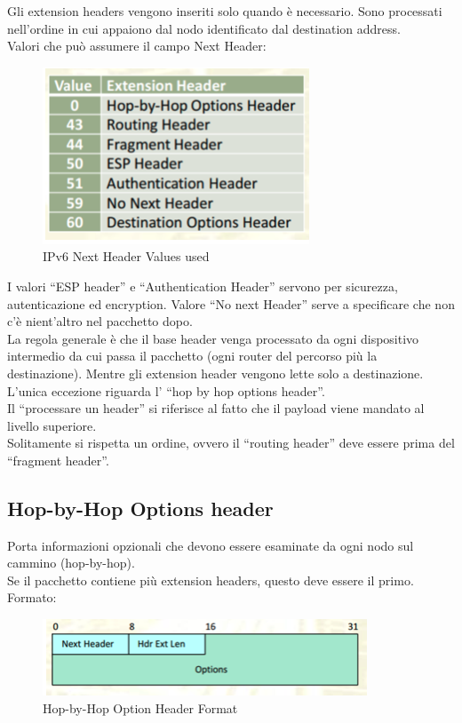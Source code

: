 \documentclass{article}
\begin{document}
Gli extension headers vengono inseriti solo quando è necessario. Sono processati nell’ordine in cui appaiono dal nodo identificato dal destination address. \\ Valori che può assumere il campo Next Header:

\begin{figure}[H]
\centering
\includegraphics[scale=0.5]{figures/next header used.png}
\caption{IPv6 Next Header Values used}
\end{figure}

I valori “ESP header” e “Authentication Header” servono per sicurezza, autenticazione ed encryption. Valore “No next Header” serve a specificare che non c’è nient’altro nel pacchetto dopo. \\ La regola generale è che il base header venga processato da ogni dispositivo intermedio da cui passa il pacchetto (ogni router del percorso più la destinazione). Mentre gli extension header vengono lette solo a destinazione. L’unica eccezione riguarda l’ “hop by hop options header”.\\ Il “processare un header” si riferisce al fatto che il payload viene mandato al livello superiore. \\ Solitamente si rispetta un ordine, ovvero il “routing header” deve essere prima del “fragment header”.

\subsection{Hop-by-Hop Options header}
Porta informazioni opzionali che devono essere esaminate da ogni nodo sul cammino (hop-by-hop).\\ Se il pacchetto contiene più extension headers, questo deve essere il primo.\\ Formato:

\begin{figure}[H]
\centering
\includegraphics[scale=0.5]{figures/hopbyhop format.png}
\caption{Hop-by-Hop Option Header Format}
\end{figure}
\end{document}
